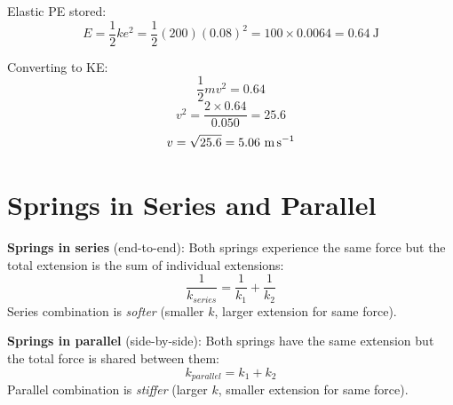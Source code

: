 \begin{solutionbox}
Elastic PE stored:
\[
  E = \frac{1}{2}ke^2
  = \frac{1}{2}(200)(0.08)^2
  = 100 \times 0.0064 = 0.64\ \text{J}
\]

Converting to KE:
\[
  \frac{1}{2}mv^2 = 0.64
\]
\[
  v^2 = \frac{2 \times 0.64}{0.050} = 25.6
\]
\[
  v = \sqrt{25.6} = 5.06\ \text{m\,s}^{-1}
\]
\end{solutionbox}

\section{Springs in Series and Parallel}

\begin{lawbox}
\textbf{Springs in series} (end-to-end):
Both springs experience the same force but the
total extension is the sum of individual extensions:
\[
  \frac{1}{k_{series}} = \frac{1}{k_1} + \frac{1}{k_2}
\]
Series combination is \textit{softer} (smaller $k$,
larger extension for same force).

\vspace{0.5cm}

\textbf{Springs in parallel} (side-by-side):
Both springs have the same extension but the total
force is shared between them:
\[
  k_{parallel} = k_1 + k_2
\]
Parallel combination is \textit{stiffer} (larger $k$,
smaller extension for same force).
\end{lawbox}

